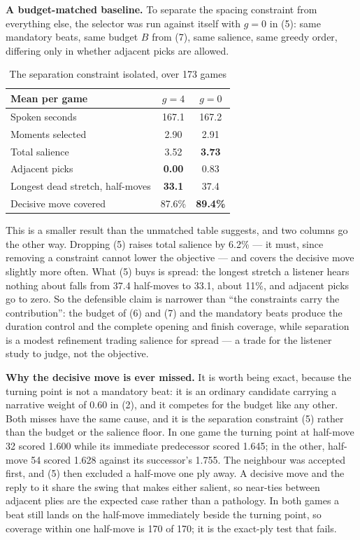 \documentclass[conference]{IEEEtran}
\newcommand{\tabsize}{\footnotesize}
\begin{document}
\textbf{A budget-matched baseline.} To separate the spacing constraint from
everything else, the selector was run against itself with $g = 0$ in (5):
same mandatory beats, same budget $B$ from (7), same salience, same greedy
order, differing only in whether adjacent picks are allowed.

\begin{table}[!t]
\caption{The separation constraint isolated, over 173 games}
\label{tab:matched}
\centering
\tabsize
\begin{tabular}{lcc}
\toprule
\textbf{Mean per game} & $g = 4$ & $g = 0$ \\
\midrule
Spoken seconds & 167.1 & 167.2 \\
Moments selected & 2.90 & 2.91 \\
Total salience & 3.52 & \textbf{3.73} \\
Adjacent picks & \textbf{0.00} & 0.83 \\
Longest dead stretch, half-moves & \textbf{33.1} & 37.4 \\
Decisive move covered & 87.6\% & \textbf{89.4\%} \\
\bottomrule
\end{tabular}
\end{table}

This is a smaller result than the unmatched table suggests, and two columns
go the other way. Dropping (5) raises total salience by 6.2\% --- it must,
since removing a constraint cannot lower the objective --- and covers the
decisive move slightly more often. What (5) buys is spread: the longest
stretch a listener hears nothing about falls from 37.4 half-moves to 33.1,
about 11\%, and adjacent picks go to zero. So the defensible claim is
narrower than ``the constraints carry the contribution'': the budget of (6)
and (7) and the mandatory beats produce the duration control and the
complete opening and finish coverage, while separation is a modest
refinement trading salience for spread --- a trade for the listener study to
judge, not the objective.

\textbf{Why the decisive move is ever missed.} It is worth being exact,
because the turning point is not a mandatory beat: it is an ordinary
candidate carrying a narrative weight of 0.60 in (2), and it competes for
the budget like any other. Both misses have the same cause, and it is the
separation constraint (5) rather than the budget or the salience floor. In
one game the turning point at half-move 32 scored 1.600 while its immediate
predecessor scored 1.645; in the other, half-move 54 scored 1.628 against
its successor's 1.755. The neighbour was accepted first, and (5) then
excluded a half-move one ply away. A decisive move and the reply to it share
the swing that makes either salient, so near-ties between adjacent plies are
the expected case rather than a pathology. In both games a beat still lands
on the half-move immediately beside the turning point, so coverage within
one half-move is 170 of 170; it is the exact-ply test that fails.
\end{document}
